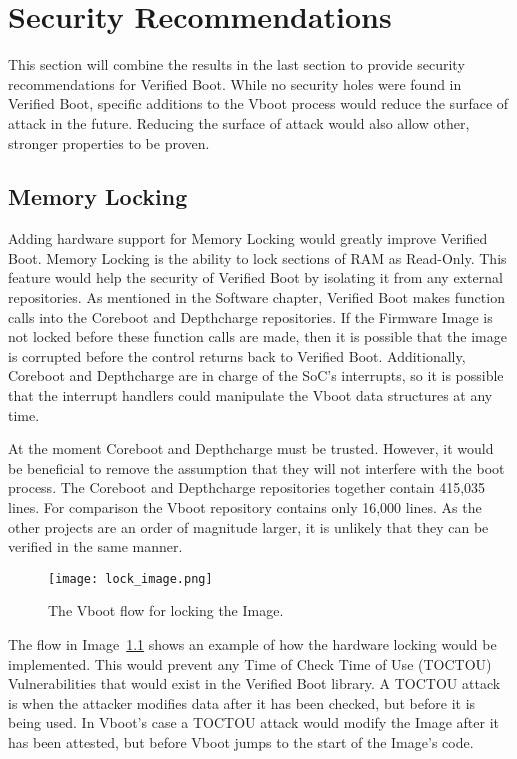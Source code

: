 \chapter{Security Recommendations}

This section will combine the results in the last section to provide security
recommendations for Verified Boot.
While no security holes were found in Verified Boot, specific additions to the
Vboot process would reduce the surface of attack in the future.
Reducing the surface of attack would also allow other, stronger properties to be
proven.

\section{Memory Locking}

Adding hardware support for Memory Locking would greatly improve Verified Boot.
Memory Locking is the ability to lock sections of RAM as Read-Only.
This feature would help the security of Verified Boot by isolating it from
any external repositories.
As mentioned in the Software chapter, Verified Boot makes function calls into
the Coreboot and Depthcharge repositories.
If the Firmware Image is not locked before these function calls are made, then
it is possible that the image is corrupted before the control returns back to
Verified Boot.
Additionally, Coreboot and Depthcharge are in charge of the SoC's interrupts,
so it is possible that the interrupt handlers could manipulate the Vboot data
structures at any time.

At the moment Coreboot and Depthcharge must be trusted.
However, it would be beneficial to remove the assumption that they will not
interfere with the boot process.
The Coreboot and Depthcharge repositories together contain 415,035 lines. 
For comparison the Vboot repository contains only 16,000 lines. 
As the other projects are an order of magnitude larger, it is unlikely that they
can be verified in the same manner.



\begin{figure}
  \centering
  \texttt{[image: lock\_image.png]}
  \caption[Verified Boot Program Flow w/ Locking]{The Vboot flow for locking the
      Image.
  }\label{fig:lock_flow}
\end{figure}

The flow in Image~\ref{fig:lock_flow} shows an example of how the hardware locking 
would be implemented.
This would prevent any Time of Check Time of Use (TOCTOU) Vulnerabilities that
would exist in the Verified Boot library.
A TOCTOU attack is when the attacker modifies data after it has been checked,
but before it is being used.
In Vboot's case a TOCTOU attack would modify the Image after it has been
attested, but before Vboot jumps to the start of the Image's code.

